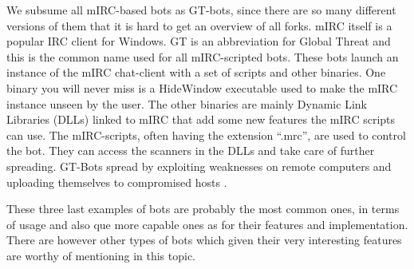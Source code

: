 \documentclass[]{article}
\begin{document}
\begin{itemize}
We subsume all mIRC-based bots as GT-bots, since there are so many different versions of them that it is hard to get an overview of all forks. mIRC itself is a popular IRC client for Windows. GT is an abbreviation for Global Threat and this is the common name used for all mIRC-scripted bots. These bots launch an instance of the mIRC chat-client with a set of scripts and other binaries. One binary you will never miss is a HideWindow executable used to make the mIRC instance unseen by the user. The other binaries are mainly Dynamic Link Libraries (DLLs) linked to mIRC that add some new features the mIRC scripts can use. The mIRC-scripts, often having the extension “.mrc”, are used to control the bot. They can access the scanners in the DLLs and take care of further spreading. GT-Bots spread by exploiting weaknesses on remote computers and uploading themselves to compromised hosts \cite{article:honeypot-tracking}.

\end{itemize}

These three last examples of bots are probably the most common ones, in terms of usage and also que more capable ones as for their features and implementation. There are however other types of bots which given their very interesting features are worthy of mentioning in this topic.
\end{document}
